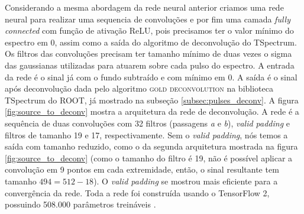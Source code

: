 \documentclass[a4paper,12pt,oneside]{book}
\begin{document}


\par Considerando a mesma abordagem da rede neural anterior criamos uma rede neural para realizar uma sequencia de convoluções e por fim uma camada \textit{fully connected} com função de ativação ReLU, pois precisamos ter o valor mínimo do espectro em 0, assim como a saída do algoritmo de deconvolução do TSpectrum. Os filtros das convoluções precisam ter tamanho mínimo de duas vezes o sigma das gaussianas utilizadas para atuarem sobre cada pulso do espectro. A entrada da rede é o sinal já com o fundo subtraído e com mínimo em 0. A saída é o sinal após deconvolução dada pelo algoritmo \textsc{gold deconvolution} na biblioteca TSpectrum do ROOT, já mostrado na subseção \ref{subsec:pulses_deconv}. A figura \ref{fig:source_to_deconv} mostra a arquitetura da rede de deconvolução. A rede é a sequência de duas convoluções com 32 filtros (passagens \textit{a} e \textit{b}), \textit{valid padding} e filtros de tamanho 19 e 17, respectivamente. Sem o \textit{valid padding}, nós temos a saída com tamanho reduzido, como o da segunda arquitetura mostrada na figura \ref{fig:source_to_deconv} (como o tamanho do filtro é 19, não é possível aplicar a convolução em 9 pontos em cada extremidade, então, o sinal resultante tem tamanho $494=512-18$). O \textit{valid padding} se mostrou mais eficiente para a convergência da rede. Toda a rede foi construída usando o TensorFlow 2, possuindo 508.000 parâmetros treináveis \cite{FORTINO2022166497}.


\end{document}

